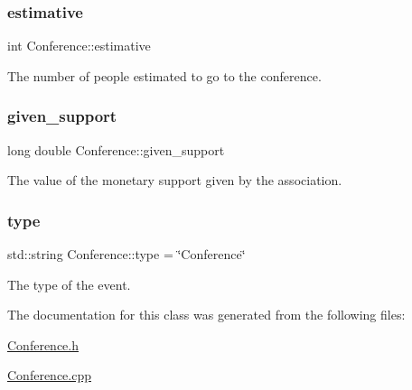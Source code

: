 \subsubsection{\texorpdfstring{estimative}{estimative}}
{\footnotesize\ttfamily int Conference\+::estimative\hspace{0.3cm}{\ttfamily [private]}}



The number of people estimated to go to the conference. 

\mbox{\label{classConference_a800a31bff9c492bc417cf8cecf450195}} 
\subsubsection{\texorpdfstring{given\+\_\+support}{given\_support}}
{\footnotesize\ttfamily long double Conference\+::given\+\_\+support\hspace{0.3cm}{\ttfamily [private]}}



The value of the monetary support given by the association. 

\mbox{\label{classConference_af456d5097dc28808360f0d0fba2160c6}} 
\subsubsection{\texorpdfstring{type}{type}}
{\footnotesize\ttfamily std\+::string Conference\+::type = \char`\"{}Conference\char`\"{}\hspace{0.3cm}{\ttfamily [private]}}



The type of the event. 



The documentation for this class was generated from the following files\+:\begin{DoxyCompactItemize}
\item 
\hyperlink{Conference_8h}{Conference.\+h}\item 
\hyperlink{Conference_8cpp}{Conference.\+cpp}\end{DoxyCompactItemize}
